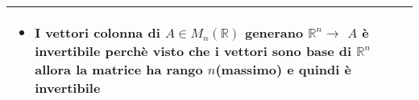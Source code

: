 \documentclass[10pt]{article}
\begin{document}
\begin{landscape}
\begin{minipage}[t]{0.49\textwidth}
\begin{tabular}{| m{2cm} | m{15cm} |}
\begin{itemize}
        \item I vettori colonna di $A\in M_{n}(\mathbb{R})$ generano $\mathbb{R}^{n}\rightarrow$ $A$ è invertibile perchè visto che i vettori sono base di $\mathbb{R}^{n}$ allora la matrice ha rango $n$(massimo) e quindi è invertibile
    \end{itemize}\\
    \hline
\end{tabular}
\end{minipage}

\end{landscape}
\end{document}
